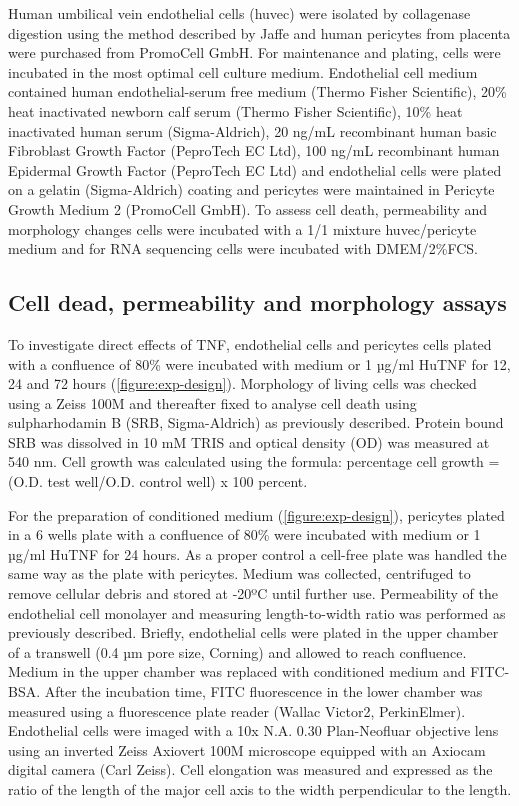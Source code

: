 Human umbilical vein endothelial cells (huvec) were isolated by collagenase digestion using the method described by Jaffe\cite{Jaffe_1973} and human pericytes from placenta were purchased from PromoCell GmbH. For maintenance and plating, cells were incubated in the most optimal cell culture medium. Endothelial cell medium contained human endothelial-serum free medium (Thermo Fisher Scientific), 20\% heat inactivated newborn calf serum (Thermo Fisher Scientific), 10\% heat inactivated human serum (Sigma-Aldrich), 20 ng/mL recombinant human basic Fibroblast Growth Factor (PeproTech EC Ltd), 100 ng/mL recombinant human Epidermal Growth Factor (PeproTech EC Ltd) and endothelial cells were plated on a gelatin (Sigma-Aldrich) coating\cite{Seynhaeve_2006} and pericytes were maintained in Pericyte Growth Medium 2 (PromoCell GmbH). To assess cell death, permeability and morphology changes cells were incubated with a 1/1 mixture huvec/pericyte medium and for RNA sequencing cells were incubated with DMEM/2\%FCS.

\subsection*{Cell dead, permeability and morphology assays}

To investigate direct effects of TNF, endothelial cells and pericytes cells plated with a confluence of 80\% were incubated with medium or 1 µg/ml HuTNF for 12, 24 and 72 hours (\cref{figure:exp-design}). Morphology of living cells was checked using a Zeiss 100M and thereafter fixed to analyse cell death using sulpharhodamin B (SRB, Sigma-Aldrich) as previously described\cite{Seynhaeve_2006}. Protein bound SRB was dissolved in 10 mM TRIS and optical density (OD) was measured at 540 nm. Cell growth was calculated using the formula: percentage cell growth = (O.D. test well/O.D. control well) x 100 percent.

For the preparation of conditioned medium (\cref{figure:exp-design}), pericytes plated in a 6 wells plate with a confluence of 80\% were incubated with medium or 1 µg/ml HuTNF for 24 hours. As a proper control a cell-free plate was handled the same way as the plate with pericytes. Medium was collected, centrifuged to remove cellular debris and stored at -20ºC until further use. Permeability of the endothelial cell monolayer and measuring length-to-width ratio was performed as previously described\cite{Seynhaeve_2006,Seynhaeve_2014}. Briefly, endothelial cells were plated in the upper chamber of a transwell (0.4 µm pore size, Corning) and allowed to reach confluence. Medium in the upper chamber was replaced with conditioned medium and FITC-BSA. After the incubation time, FITC fluorescence in the lower chamber was measured using a fluorescence plate reader (Wallac Victor2, PerkinElmer). Endothelial cells were imaged with a 10x N.A. 0.30 Plan-Neofluar objective lens using an inverted Zeiss Axiovert 100M microscope equipped with an Axiocam digital camera (Carl Zeiss). Cell elongation was measured and expressed as the ratio of the length of the major cell axis to the width perpendicular to the length.


